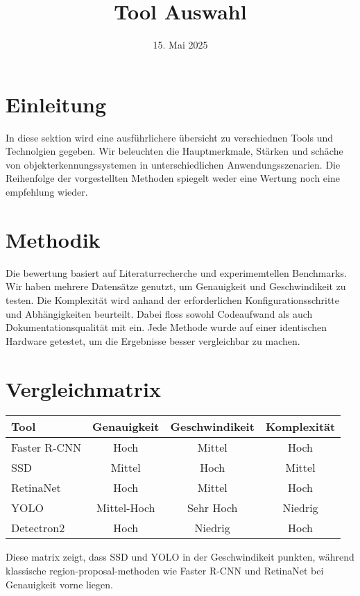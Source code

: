 \documentclass[12pt]{article}
\begin{document}
\title{Tool Auswahl}
\date{15. Mai 2025}

\maketitle

\section{Einleitung}
In diese sektion wird eine ausführlichere übersicht zu verschiednen Tools und Technolgien gegeben. Wir beleuchten die Hauptmerkmale, Stärken und schäche von objekterkennungssystemen in unterschiedlichen Anwendungsszenarien. Die Reihenfolge der vorgestellten Methoden spiegelt weder eine Wertung noch eine empfehlung wieder.

\section{Methodik}
Die bewertung basiert auf Literaturrecherche und experimemtellen Benchmarks. Wir haben mehrere Datensätze genutzt, um Genauigkeit und Geschwindikeit zu testen. Die Komplexität wird anhand der erforderlichen Konfigurationsschritte und Abhängigkeiten beurteilt. Dabei floss sowohl Codeaufwand als auch Dokumentationsqualität mit ein. Jede Methode wurde auf einer identischen Hardware getestet, um die Ergebnisse besser vergleichbar zu machen.

\section{Vergleichmatrix}
\begin{center}
\begin{tabular}{lccc}
\toprule
Tool & Genauigkeit & Geschwindikeit & Komplexität \\
\midrule
Faster R-CNN & Hoch & Mittel & Hoch \\
SSD & Mittel & Hoch & Mittel \\
RetinaNet & Hoch & Mittel & Hoch \\
YOLO & Mittel-Hoch & Sehr Hoch & Niedrig \\
Detectron2 & Hoch & Niedrig & Hoch \\
\bottomrule
\end{tabular}
\end{center}
Diese matrix zeigt, dass SSD und YOLO in der Geschwindikeit punkten, während klassische region-proposal-methoden wie Faster R-CNN und RetinaNet bei Genauigkeit vorne liegen.
\end{document}
